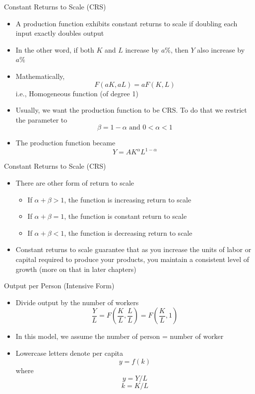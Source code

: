\documentclass[aspectratio=1610]{beamer}
\begin{document}
\begin{frame}[wide]{Constant Returns to Scale (CRS)}
	\begin{itemize}
		\item A production function exhibits constant returns to scale if doubling each input exactly doubles output
		\item In the other word, if both $K$ and $L$ increase by $a\%$, then $Y$ also increase by $a\%$
		\item Mathematically,
		\[F(aK,aL) = aF(K,L)\]
		i.e., Homogeneous function (of degree 1)
		\item Usually, we want the production function to be CRS. To do that we restrict the parameter to
		\[\beta = 1-\alpha \text{   and  } 0<\alpha <1\]
		\item The production function became
		\[Y= A K^\alpha L^{1-\alpha}\]
	\end{itemize}
\end{frame}

\begin{frame}[wide]{Constant Returns to Scale (CRS)}
	\begin{itemize}
		\item There are other form of return to scale
		\begin{itemize}
			\item If $\alpha +\beta >1$, the function is increasing return to scale
			\item If $\alpha +\beta =1$, the function is constant return to scale
			\item If $\alpha +\beta <1$, the function is decreasing return to scale
		\end{itemize}
		\item Constant returns to scale guarantee that as you increase the units of labor or capital required to produce your products, you maintain a consistent level of growth (more on that in later chapters)
	\end{itemize}
\end{frame}

\begin{frame}[wide]{Output per Person (Intensive Form)}
	\begin{itemize}
		\item Divide output by the number of workers
		\[\frac{Y}{L} = F\left(\frac{K}{L},\frac{L}{L}\right) = F\left(\frac{K}{L},1\right)\]
		\item In this model, we assume the number of person = number of worker
		\item Lowercase letters denote per capita
		\[y = f(k)\]
		where
		\[y = Y/L\]
		\[k= K/L\]
	\end{itemize}
\end{frame}
\end{document}
